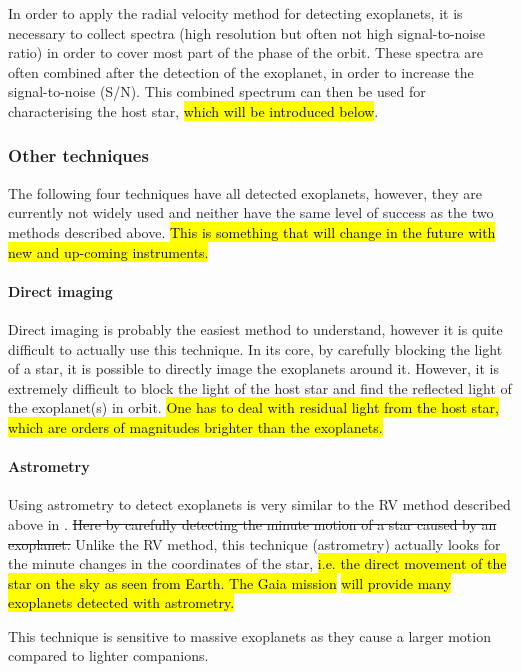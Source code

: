 In order to apply the radial velocity method for detecting exoplanets, it is necessary to collect
spectra (high resolution but often not high signal-to-noise ratio) in order to cover most part of
the phase of the orbit. These spectra are often combined after the detection of the exoplanet, in
order to increase the signal-to-noise (S/N). This combined spectrum can then be used for
characterising the host star, \hl{which will be introduced below}.


\subsubsection{Other techniques}

The following four techniques have all detected exoplanets, however, they are currently not widely
used and neither have the same level of success as the two methods described above. \hl{This is
something that will change in the future with new and up-coming instruments.}

\paragraph{Direct imaging}

Direct imaging is probably the easiest method to understand, however it is quite difficult to
actually use this technique. In its core, by carefully blocking the light of a star, it is possible
to directly image the exoplanets around it. However, it is extremely difficult to block the light
of the host star and find the reflected light of the exoplanet(s) in orbit. \hl{One has to deal with
residual light from the host star, which are orders of magnitudes brighter than the exoplanets.}


\paragraph{Astrometry}

Using astrometry to detect exoplanets is very similar to the RV method described above in
. \st{Here by carefully detecting the minute motion of a star caused by an
exoplanet.} Unlike the RV method, this technique (astrometry) actually looks for the minute changes
in the coordinates of the star, \hl{i.e. the direct movement of the star on the sky as seen from
Earth. The Gaia mission} \citep{GAIA} \hl{will provide many exoplanets detected with astrometry.}

This technique is sensitive to massive exoplanets as they cause a larger motion compared to lighter
companions.


